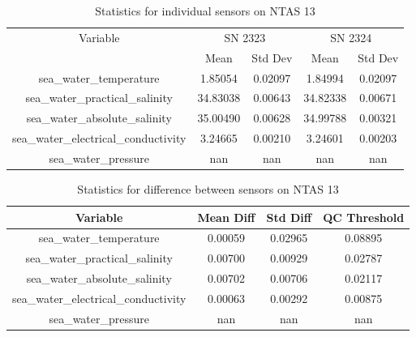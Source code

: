 \begin{table}[h]
\centering
\begin{tabular}{|c|c|c|c|c|}
\hline
Variable & \multicolumn{2}{c|}{SN 2323} & \multicolumn{2}{c|}{SN 2324} \\
& Mean & Std Dev & Mean & Std Dev \\
\hline
sea\_water\_temperature & 1.85054 & 0.02097 & 1.84994 & 0.02097 \\
sea\_water\_practical\_salinity & 34.83038 & 0.00643 & 34.82338 & 0.00671 \\
sea\_water\_absolute\_salinity & 35.00490 & 0.00628 & 34.99788 & 0.00321 \\
sea\_water\_electrical\_conductivity & 3.24665 & 0.00210 & 3.24601 & 0.00203 \\
sea\_water\_pressure & nan & nan & nan & nan \\
\hline
\end{tabular}
\caption{Statistics for individual sensors on NTAS 13}
\end{table}

\begin{table}[h]
\centering
\begin{tabular}{|c|c|c|c|}
\hline
Variable & Mean Diff & Std Diff & QC Threshold \\
\hline
sea\_water\_temperature & 0.00059 & 0.02965 & 0.08895 \\
sea\_water\_practical\_salinity & 0.00700 & 0.00929 & 0.02787 \\
sea\_water\_absolute\_salinity & 0.00702 & 0.00706 & 0.02117 \\
sea\_water\_electrical\_conductivity & 0.00063 & 0.00292 & 0.00875 \\
sea\_water\_pressure & nan & nan & nan \\
\hline
\end{tabular}
\caption{Statistics for difference between sensors on NTAS 13}
\end{table}
